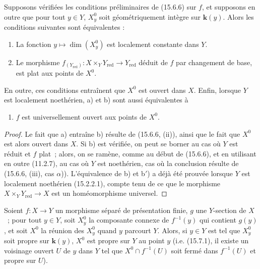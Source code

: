 \begin{corollary}[15.6.7]
\label{IV.15.6.7-fr}
Supposons vérifiées les conditions préliminaires de (15.6.6) sur $f$, et supposons en outre que pour tout $y\in Y$, $X_y^0$ soit géométriquement intègre sur $\mathbf{k}(y)$. Alors les conditions suivantes sont équivalentes :
\begin{enumerate}[label=\emph{\alph*)}]
  \item La fonction $y\mapsto\dim(X_y^0)$ est localement constante dans $Y$.
  \item Le morphisme $f_{(Y_{\mathrm{red}})}:X\times_Y Y_{\mathrm{red}}\to Y_{\mathrm{red}}$ déduit de $f$ par changement de base, est plat aux points de $X^0$.
\end{enumerate}

En outre, ces conditions entraînent que $X^0$ est ouvert dans $X$. Enfin, lorsque $Y$ est localement noethérien, a) et b) sont aussi équivalentes à
\begin{enumerate}
  \item[\rm b$'$)] $f$ est universellement ouvert aux points de $X^0$.
\end{enumerate}
\end{corollary}

\begin{proof}
Le fait que a) entraîne b) résulte de (15.6.6, (ii)), ainsi que le fait que $X^0$ est alors ouvert dans $X$. Si b) est vérifiée, on peut se borner au cas où $Y$ est réduit et $f$ plat~; alors, on se ramène, comme au début de (15.6.6), et en utilisant en outre (11.2.7), au cas où $Y$ est noethérien, cas où la conclusion résulte de (15.6.6, (iii), cas $\alpha$)). L'équivalence de b) et b$'$) a déjà été prouvée lorsque $Y$ est localement noethérien (15.2.2.1), compte tenu de ce que le morphisme $X\times_Y Y_{\mathrm{red}}\to X$ est un homéomorphisme universel.
\end{proof}

\begin{proposition}[15.6.8]
\label{IV.15.6.8-fr}
Soient $f:X\to Y$ un morphisme séparé de présentation finie, $g$ une $Y$-section de $X$~; pour tout $y\in Y$, soit $X_y^0$ la composante connexe de $f^{-1}(y)$ qui contient $g(y)$, et soit $X^0$ la réunion des $X_y^0$ quand $y$ parcourt $Y$. Alors, si $y\in Y$ est tel que $X_y^0$ soit propre sur $\mathbf{k}(y)$, $X^0$ est propre sur $Y$ au point $y$ (i.e. (15.7.1), il existe un voisinage ouvert $U$ de $y$ dans $Y$ tel que $X^0\cap f^{-1}(U)$ soit fermé dans $f^{-1}(U)$ et propre sur $U$).
\end{proposition}

